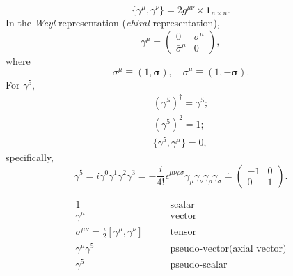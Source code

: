 \begin{equation*}
  \{\gamma^\mu, \gamma^\nu\} = 2g^{\mu\nu} \times \mathbf{1}_{n\times n}.
\end{equation*}
In the \textit{Weyl} representation (\textit{chiral} representation),
\begin{equation*}
  \gamma^\mu=\begin{pmatrix}
    0                & \sigma^\mu \\
    \bar{\sigma}^\mu & 0
  \end{pmatrix},
\end{equation*}
where
\begin{equation*}
  \sigma^\mu \equiv (1, \bm{\sigma}), \quad \bar{\sigma}^\mu \equiv (1, -\bm{\sigma}).
\end{equation*}
For $\gamma^5$,
\begin{gather*}
  (\gamma^5)^\dagger = \gamma^5; \\
  (\gamma^5)^2 = 1; \\
  \{\gamma^5, \gamma^\mu\} = 0,
\end{gather*}
specifically,
\begin{equation*}
  \gamma^5=i\gamma^0\gamma^1\gamma^2\gamma^3=-\frac{i}{4!}\epsilon^{\mu\nu\rho\sigma}\gamma_\mu\gamma_\nu\gamma_\rho\gamma_\sigma\doteq \begin{pmatrix}
    -1 & 0 \\
    0  & 1
  \end{pmatrix}.
\end{equation*}

\begin{equation*}
  \begin{array}{cc}
    1                                                     & \qquad\textrm{scalar}                      \\
    \gamma^\mu                                            & \qquad\textrm{vector}                      \\
    \sigma^{\mu\nu} = \frac{i}{2}[\gamma^\mu, \gamma^\nu] & \qquad\textrm{tensor}                      \\
    \gamma^\mu\gamma^5                                    & \qquad\textrm{pseudo-vector(axial vector)} \\
    \gamma^5                                              & \qquad\textrm{pseudo-scalar}
  \end{array}
\end{equation*}

